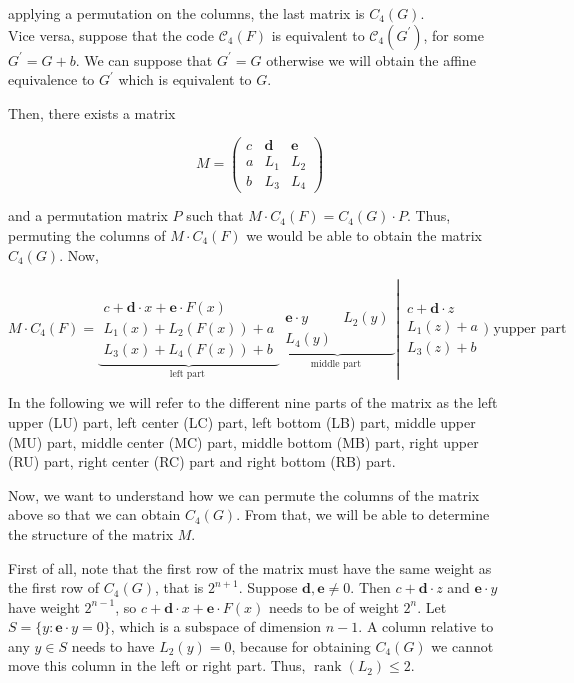 \documentclass[10pt]{article}
\begin{document}
applying a permutation on the columns, the last matrix is $C_{4}(G)$.\\
Vice versa, suppose that the code $\mathscr{C}_{4}(F)$ is equivalent to $\mathscr{C}_{4}\left(G^{\prime}\right)$, for some $G^{\prime}=G+b$. We can suppose that $G^{\prime}=G$ otherwise we will obtain the affine equivalence to $G^{\prime}$ which is equivalent to $G$.

Then, there exists a matrix

$$
M=\left(\begin{array}{ccc}
c & \mathbf{d} & \mathbf{e} \\
a & L_{1} & L_{2} \\
b & L_{3} & L_{4}
\end{array}\right)
$$

and a permutation matrix $P$ such that $M \cdot C_{4}(F)=C_{4}(G) \cdot P$. Thus, permuting the columns of $M \cdot C_{4}(F)$ we would be able to obtain the matrix $C_{4}(G)$. Now,

$$
\left.M \cdot C_{4}(F)=\underbrace{\begin{array}{c}
c+\mathbf{d} \cdot x+\mathbf{e} \cdot F(x) \\
L_{1}(x)+L_{2}(F(x))+a \\
L_{3}(x)+L_{4}(F(x))+b
\end{array}}_{\text {left part }} \underbrace{\begin{array}{c|c}
\mathbf{e} \cdot y & L_{2}(y) \\
L_{4}(y)
\end{array}}_{\text {middle part }} \right\rvert\, \begin{array}{c}
c+\mathbf{d} \cdot z \\
L_{1}(z)+a \\
L_{3}(z)+b
\end{array}) \text { yupper part }
$$

In the following we will refer to the different nine parts of the matrix as the left upper (LU) part, left center (LC) part, left bottom (LB) part, middle upper (MU) part, middle center (MC) part, middle bottom (MB) part, right upper (RU) part, right center (RC) part and right bottom (RB) part.

Now, we want to understand how we can permute the columns of the matrix above so that we can obtain $C_{4}(G)$. From that, we will be able to determine the structure of the matrix $M$.

First of all, note that the first row of the matrix must have the same weight as the first row of $C_{4}(G)$, that is $2^{n+1}$. Suppose $\mathbf{d}, \mathbf{e} \neq 0$. Then $c+\mathbf{d} \cdot z$ and $\mathbf{e} \cdot y$ have weight $2^{n-1}$, so $c+\mathbf{d} \cdot x+\mathbf{e} \cdot F(x)$ needs to be of weight $2^{n}$. Let $S=\{y: \mathbf{e} \cdot y=0\}$, which is a subspace of dimension $n-1$. A column relative to any $y \in S$ needs to have $L_{2}(y)=0$, because for obtaining $C_{4}(G)$ we cannot move this column in the left or right part. Thus, $\operatorname{rank}\left(L_{2}\right) \leq 2$.
\end{document}

